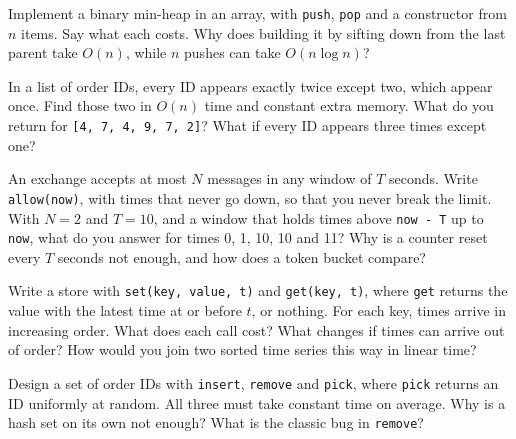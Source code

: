 \begin{question}\label{iq:iv3:algorithms:40}
Implement a binary min-heap in an array, with \texttt{push}, \texttt{pop} and a constructor from $n$ items. Say what each costs. Why does building it by sifting down from the last parent take $O(n)$, while $n$ pushes can take $O(n \log n)$?
\end{question}

\begin{question}\label{iq:iv3:algorithms:41}
In a list of order IDs, every ID appears exactly twice except two, which appear once. Find those two in $O(n)$ time and constant extra memory. What do you return for \texttt{[4, 7, 4, 9, 7, 2]}? What if every ID appears three times except one?
\end{question}

\begin{question}\label{iq:iv3:algorithms:42}
An exchange accepts at most $N$ messages in any window of $T$ seconds. Write \texttt{allow(now)}, with times that never go down, so that you never break the limit. With $N = 2$ and $T = 10$, and a window that holds times above \texttt{now - T} up to \texttt{now}, what do you answer for times 0, 1, 10, 10 and 11? Why is a counter reset every $T$ seconds not enough, and how does a token bucket compare?
\end{question}

\begin{question}\label{iq:iv3:algorithms:43}
Write a store with \texttt{set(key, value, t)} and \texttt{get(key, t)}, where \texttt{get} returns the value with the latest time at or before $t$, or nothing. For each key, times arrive in increasing order. What does each call cost? What changes if times can arrive out of order? How would you join two sorted time series this way in linear time?
\end{question}

\begin{question}\label{iq:iv3:algorithms:44}
Design a set of order IDs with \texttt{insert}, \texttt{remove} and \texttt{pick}, where \texttt{pick} returns an ID uniformly at random. All three must take constant time on average. Why is a hash set on its own not enough? What is the classic bug in \texttt{remove}?
\end{question}

